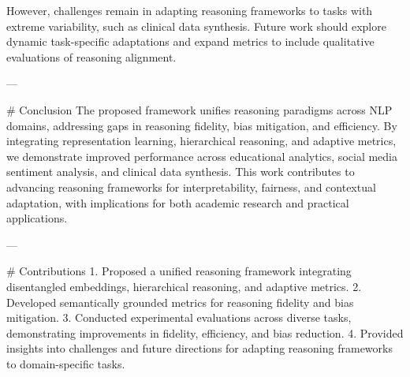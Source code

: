 However, challenges remain in adapting reasoning frameworks to tasks with extreme variability, such as clinical data synthesis. Future work should explore dynamic task-specific adaptations and expand metrics to include qualitative evaluations of reasoning alignment.

---

# Conclusion  
The proposed framework unifies reasoning paradigms across NLP domains, addressing gaps in reasoning fidelity, bias mitigation, and efficiency. By integrating representation learning, hierarchical reasoning, and adaptive metrics, we demonstrate improved performance across educational analytics, social media sentiment analysis, and clinical data synthesis. This work contributes to advancing reasoning frameworks for interpretability, fairness, and contextual adaptation, with implications for both academic research and practical applications.

---

# Contributions  
1. Proposed a unified reasoning framework integrating disentangled embeddings, hierarchical reasoning, and adaptive metrics.  
2. Developed semantically grounded metrics for reasoning fidelity and bias mitigation.  
3. Conducted experimental evaluations across diverse tasks, demonstrating improvements in fidelity, efficiency, and bias reduction.  
4. Provided insights into challenges and future directions for adapting reasoning frameworks to domain-specific tasks.  

